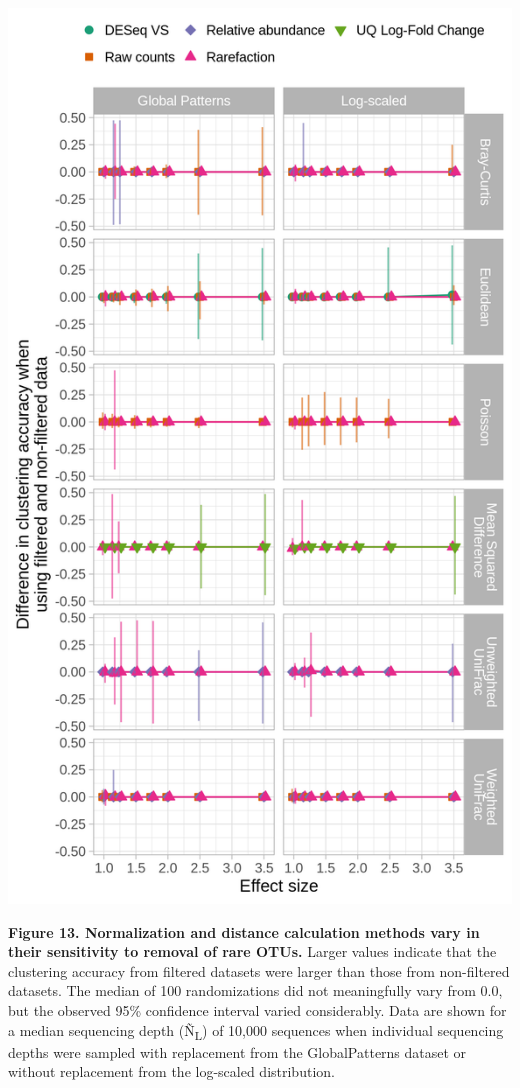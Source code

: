 \documentclass[
]{article}
\begin{document}
\includegraphics{figure_13.png}

\textbf{Figure 13. Normalization and distance calculation methods vary
in their sensitivity to removal of rare OTUs.} Larger values indicate
that the clustering accuracy from filtered datasets were larger than
those from non-filtered datasets. The median of 100 randomizations did
not meaningfully vary from 0.0, but the observed 95\% confidence
interval varied considerably. Data are shown for a median sequencing
depth (Ñ\textsubscript{L}) of 10,000 sequences when individual
sequencing depths were sampled with replacement from the GlobalPatterns
dataset or without replacement from the log-scaled distribution.
\end{document}
